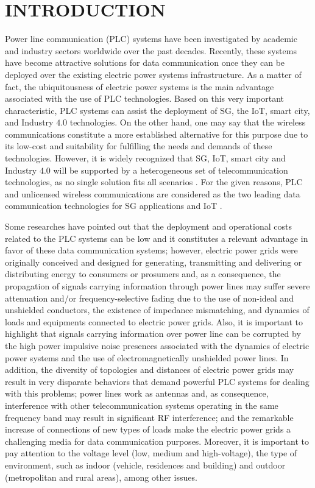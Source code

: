 \chapter{INTRODUCTION}   \label{Introduction}

Power line communication (PLC) systems have been investigated by academic and industry sectors worldwide over the past decades. Recently, these systems have become attractive solutions for data communication once they can be deployed over the existing electric power systems infrastructure. As a matter of fact, the ubiquitousness of electric power systems is the main advantage associated with the use of \ac{PLC} technologies. Based on this very important characteristic, \ac{PLC} systems can assist the deployment of \ac{SG}, the \ac{IoT}, smart city, and Industry $4.0$ technologies. On the other hand, one may say that the wireless communications constitute a more established alternative for this purpose due to its low-cost and suitability for fulfilling the needs and demands of these technologies. However, it is widely recognized that \ac{SG}, \ac{IoT}, smart city and Industry $4.0$ will be supported by a heterogeneous set of telecommunication technologies, as no single solution fits all scenarios \cite{Galli2011,Verma}. For the given reasons, \ac{PLC} and unlicensed wireless communications are considered as the two leading data communication technologies for \ac{SG} applications and \ac{IoT} \cite{Sayed2014, Dib, Sayed2015}. 

Some researches have pointed out that the deployment and operational costs related to the \ac{PLC} systems can be low \cite{Hrasnica:PLC_design, Dib} and it constitutes a relevant advantage in favor of these data communication systems; however, electric power grids were originally conceived and designed for generating, transmitting and delivering or distributing energy to consumers or prosumers and, as a consequence, the propagation of signals carrying information through power lines may suffer severe attenuation and/or frequency-selective fading due to the use of non-ideal and unshielded conductors, the existence of impedance mismatching, and dynamics of loads and equipments connected to electric power grids. Also, it is important to highlight that signals carrying information over power line can be corrupted by the high power impulsive noise presences associated with the dynamics of electric power systems and the use of electromagnetically unshielded power lines. In addition, the diversity of topologies and distances of electric power grids may result in very disparate behaviors that demand powerful \ac{PLC} systems for dealing with this problems; power lines work as antennas and, as consequence, interference with other telecommunication systems operating in the same frequency band may result in significant \ac{RF} interference; and the remarkable increase of connections of new types of loads make the electric power grids a challenging media for data communication purposes. Moreover, it is important to pay attention to the voltage level (low, medium and high-voltage), the type of environment, such as indoor (vehicle, residences and building) and outdoor (metropolitan and rural areas), among other issues.

